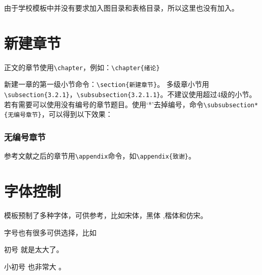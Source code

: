 由于学校模板中并没有要求加入图目录和表格目录，所以这里也没有加入。

\section{新建章节}

正文的章节使用\verb|\chapter|，例如：\verb|\chapter{绪论}|

新建一章的第一级小节命令：\verb|\section{新建章节}|。
多级章小节用\verb|\subsection{3.2.1}|，\verb|\subsubsection{3.2.1.1}|。不建议使用超过4级的小节。若有需要可以使用没有编号的章节题目。使用`*'去掉编号，命令\verb|\subsubsection*{无编号章节}|，可以得到以下效果：

\subsubsection*{无编号章节}

参考文献之后的章节用\verb|\appendix|命令，如\verb|\appendix{致谢}|。

\section{字体控制}

模板预制了多种字体，可供参考，比如{\songti 宋体}，{\heiti 黑体 },{\kaiti 楷体}和{\fangsong 仿宋}。

字号也有很多可供选择，比如 

{\chuhao 初号} 就是太大了。

{\xiaochuhao 小初号} 也非常大 。

